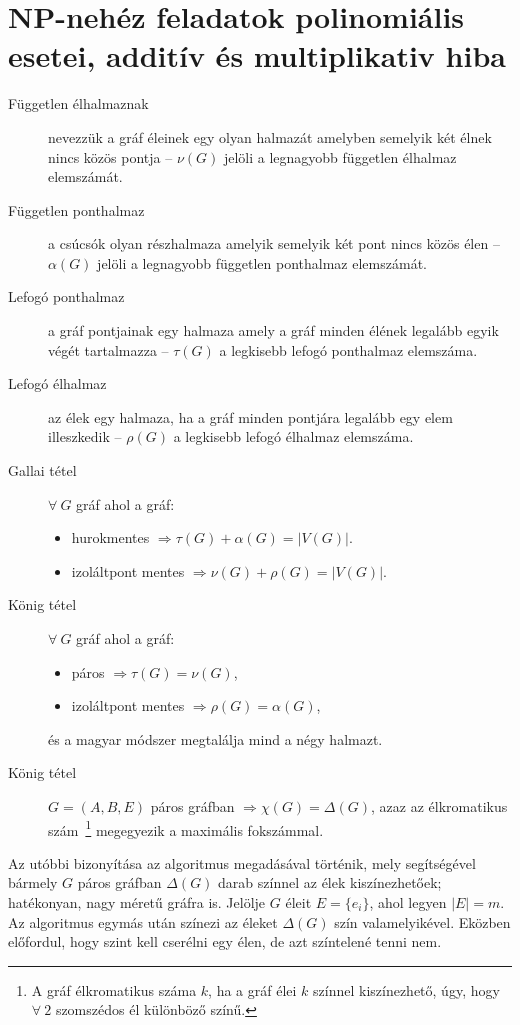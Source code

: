 \section{NP-nehéz feladatok polinomiális esetei, additív és multiplikativ hiba}

\begin{description}
  \item[Független élhalmaznak] nevezzük a gráf éleinek egy olyan halmazát
  amelyben semelyik két élnek nincs közös pontja -- $\nu(G)$ jelöli a legnagyobb
  független élhalmaz elemszámát.
  \item[Független ponthalmaz]  a csúcsók olyan részhalmaza amelyik semelyik két
  pont nincs közös élen -- $\alpha(G)$ jelöli a legnagyobb független ponthalmaz
  elemszámát.
  \item[Lefogó ponthalmaz] a gráf pontjainak egy halmaza amely a gráf minden
  élének legalább egyik végét tartalmazza -- $\tau(G)$ a legkisebb lefogó
  ponthalmaz elemszáma.
  \item[Lefogó élhalmaz] az élek egy halmaza, ha a gráf minden pontjára legalább
  egy elem illeszkedik -- $\rho(G)$ a legkisebb lefogó élhalmaz elemszáma.
  \item[Gallai tétel] $\forall~G$ gráf ahol a gráf: \begin{itemize}
  		\item hurokmentes $\Rightarrow \tau(G)+\alpha(G) = |V(G)|$. 
  		\item izoláltpont mentes $\Rightarrow \nu(G) +\rho(G) = |V(G)|$.
   \end{itemize} 
   \item[König tétel] $\forall~G$ gráf ahol a gráf: \begin{itemize}
     \item páros $\Rightarrow \tau(G)=\nu(G)$,
     \item izoláltpont mentes $\Rightarrow \rho(G) = \alpha(G)$,
   \end{itemize}
   és a magyar módszer megtalálja mind a négy halmazt.
   \item[König tétel] $G=(A,B,E)$ páros gráfban $\Rightarrow \chi(G) =
   \Delta(G)$, azaz az élkromatikus szám~\footnote{A gráf élkromatikus száma
   $k$, ha a gráf élei $k$  színnel kiszínezhető, úgy, hogy $\forall~2$
   szomszédos él különböző színű. } megegyezik a maximális fokszámmal.
\end{description}

Az utóbbi bizonyítása az algoritmus megadásával történik, mely segítségével
bármely $G$ páros gráfban $\Delta(G)$ darab színnel az élek kiszínezhetőek;
hatékonyan, nagy méretű gráfra is. Jelölje $G$ éleit $E=\{ e_i \}$, ahol legyen
$|E|=m$. Az algoritmus egymás után színezi az éleket $\Delta(G)$ szín valamelyikével.
Eközben előfordul, hogy szint kell cserélni egy élen, de azt színtelené tenni nem.


